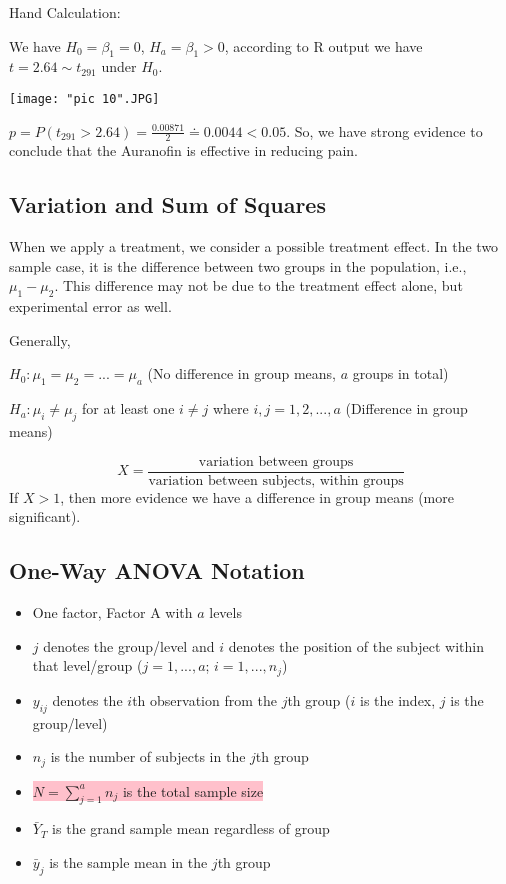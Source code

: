 \documentclass[a4paper,11pt]{article}
\begin{document}
Hand Calculation: 

We have $H_0=\beta_1=0$, $H_a=\beta_1>0$, according to R output we have $t=2.64\sim t_{291}$ under $H_0$. 

\begin{center}
	\texttt{[image: "pic 10".JPG]}
\end{center}

$p=P(t_{291}>2.64)=\frac{0.00871}{2}\doteq 0.0044<0.05$. So, we have strong evidence to conclude that the Auranofin is effective in reducing pain. 

\subsection{Variation and Sum of Squares}
When we apply a treatment, we consider a possible treatment effect. In the two sample case, it is the difference between two groups in the population, i.e., $\mu_1-\mu_2$. This difference may not be due to the treatment effect alone, but experimental error as well. 

Generally, 

$H_0: \mu_1=\mu_2=...=\mu_a$ (No difference in group means, $a$ groups in total)

$H_a: \mu_i\neq \mu_j$ for at least one $i\neq j$ where $i,j=1,2,...,a$ (Difference in group means)

$$X=\frac{\text{variation between groups}}{\text{variation between subjects, within groups}}$$
If $X>1$, then more evidence we have a difference in group means (more significant). 

\subsection{One-Way ANOVA Notation}
\begin{itemize}
\item One factor, Factor A with $a$ levels
\item $j$ denotes the group/level and $i$ denotes the position of the subject within that level/group ($j=1,...,a$; $i=1,...,n_j$)
\item $y_{ij}$ denotes the $i$th observation from the $j$th group ($i$ is the index, $j$ is the group/level)
\item $n_j$ is the number of subjects in the $j$th group
\item \colorbox{pink}{$N=\sum_{j=1}^an_j$ is the total sample size}
\item $\bar{Y}_T$ is the grand sample mean regardless of group
\item $\bar{y}_j$ is the sample mean in the $j$th group
\end{itemize}
\end{document}
